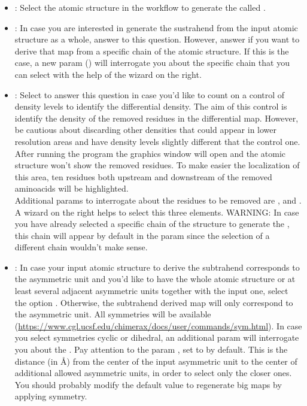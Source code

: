\begin{itemize}
\begin{itemize}
\begin{itemize}
\begin{itemize}
                                \item {}: Select the atomic structure in the \scipion workflow to generate the called .
                                \item {}: In case you are interested in generate the sustrahend  from the input atomic structure as a whole, answer  to this question. However, answer  if you want to derive that map from a specific chain of the atomic structure. If this is the case, a new param () will interrogate you about the specific chain that you can select with the help of the wizard on the right.
                                \item {}: Select  to answer this question in case you'd like to count on a control of density levels to identify the differential density. The aim of this control is identify the density of the removed residues in the differential map. However, be cautious about discarding other densities that could appear in lower resolution areas and have density levels slightly different that the control one. After running the program the \chimera graphics window will open and the atomic structure won't show the removed residues. To make easier the localization of this area, ten residues both upstream and downstream of the removed aminoacids will be highlighted.\\
                                Additional params to interrogate about the residues to be removed are ,  and . A wizard on the right helps to select this three elements. WARNING: In case you have already selected a specific chain of the structure to generate the , this chain will appear by default in the param  since the selection of a different chain wouldn't make sense.
                                \item {}: In case your input atomic structure to derive the subtrahend  corresponds to the asymmetric unit and you'd like to have the whole atomic structure or at least several adjacent asymmetric units together with the input one, select the option . Otherwise, the subtrahend derived map will only correspond to the asymmetric unit. All \chimera symmetries will be available (\url{https://www.cgl.ucsf.edu/chimerax/docs/user/commands/sym.html}). In case you select symmetries cyclic or dihedral, an additional param will interrogate you about the . Pay attention to the param , set to  by default. This is the distance (in \AA) from the center of the input asymmetric unit to the center of additional allowed asymmetric units, in order to select only the closer ones. You should probably modify the default value to regenerate big maps by applying symmetry.

\end{itemize}
\end{itemize}
\end{itemize}
\end{itemize}
